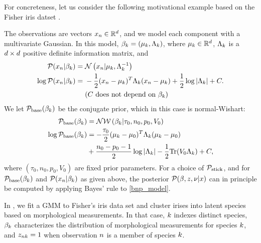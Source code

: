 For concreteness, let us consider the following motivational example
based on the Fisher iris datset \citep{anderson:1936:iris, fisher:1936:iris}.

\begin{ex}
%
The observations are vectors $x_n \in \mathbb{R}^d$, and we model each
component with a multivariate Gaussian. In this model, $\beta_k = (\mu_k,
\Lambda_k)$, where $\mu_k \in \mathbb{R}^d$, $\Lambda_k$ is a $d\times d$
positive definite information matrix, and
%
\begin{align*}
%
\p(\x_\n \vert \beta_\k) ={}& \normdist{\x_n \vert \mu_\k, \Lambda_\k^{-1}} \\
\logp(\x_\n \vert \beta_\k) ={}&
    -\frac{1}{2}(\x_n - \mu_k)^T \Lambda_\k (\x_n - \mu_k)
    + \frac{1}{2} \log |\Lambda_\k| + \const.\\
    & \constdesc{\beta_\k}
%
\end{align*}
We let $\mathcal{P}_{\mathrm{base}}(\beta_k)$ be the conjugate prior, which in this case is normal-Wishart:
\begin{align*}
  \mathcal{P}_{\mathrm{base}}(\beta_k) &= \mathcal{N}\mathcal{W}\left(\beta_k \vert \tau_0, n_0, p_0, V_0\right)\\
  \log\mathcal{P}_{\mathrm{base}}(\beta_k) &=
      -\frac{\tau_0}{2}(\mu_k - \mu_0)^T \Lambda_k (\mu_k - \mu_0)\\
      &{} + \frac{n_0 - p_0 - 1}{2} \log |\Lambda_k| -
      \frac{1}{2} \textrm{Tr}(V_0 \Lambda_k) + C,
\end{align*}
where $(\tau_0, n_0, p_0, V_0)$ are fixed prior parameters.
%
For a choice of $\mathcal{P}_{\mathrm{stick}}$, and for $\mathcal{P}_{\mathrm{base}}(\beta_k)$ and $\mathcal{P}(x_n \vert
\beta_k)$ as given above, the posterior $\mathcal{P}(\beta, z, \nu \vert x)$ can in
principle be computed by applying Bayes' rule to \eqref{bnp_model}.

In , we fit a GMM to Fisher's iris data set and cluster irises
into latent species based on morphological measurements.  In that case, $k$
indexes distinct species, $\beta_{k}$ characterizes the distribution of
morphological measurements for species $k$, and $z_{nk} = 1$ when
observation $n$ is a member of species $k$.
%
\end{ex}




